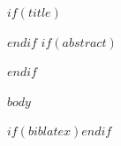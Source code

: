 \documentclass[$if(fontsize)$$fontsize$$else$12pt$endif$, $if(papersize)$$papersize$$else$letterpaper$endif$]{article}
\begin{document}
$if(title)$\maketitle$endif$
$if(abstract)$
\begin{abstract}
\noindent $abstract$
\end{abstract}
\vspace{1em}
$endif$

$body$

$if(biblatex)$\printbibliography$endif$
\end{document}
